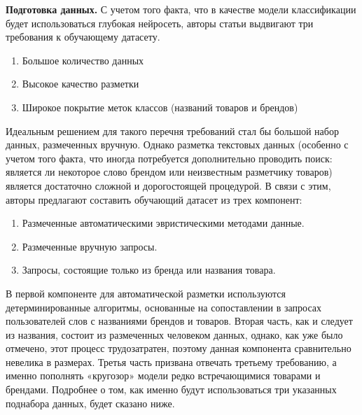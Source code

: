 \documentclass[12pt,a4paper]{article}
\begin{document}
\textbf{Подготовка данных.} С учетом того факта, что в качестве модели классификации будет использоваться глубокая нейросеть, авторы статьи выдвигают три требования к обучающему датасету.

\begin{enumerate}
    \item Большое количество данных
    \item Высокое качество разметки
    \item Широкое покрытие меток классов (названий товаров и брендов)
\end{enumerate}

\noindent Идеальным решением для такого перечня требований стал бы большой набор данных, размеченных вручную. Однако разметка текстовых данных (особенно с учетом того факта, что иногда потребуется дополнительно проводить поиск: является ли некоторое слово брендом или неизвестным разметчику товаров) является достаточно сложной и дорогостоящей процедурой. В связи с этим, авторы предлагают составить обучающий датасет из трех компонент:

\begin{enumerate}
    \item Размеченные автоматическими эвристическими методами данные.
    \item Размеченные вручную запросы.
    \item Запросы, состоящие только из бренда или названия товара.
\end{enumerate}

\noindent В первой компоненте для автоматической разметки используются детерминированные алгоритмы, основанные на сопоставлении в запросах пользователей слов с названиями брендов и товаров. Вторая часть, как и следует из названия, состоит из размеченных человеком данных, однако, как уже было отмечено, этот процесс трудозатратен, поэтому данная компонента сравнительно невелика в размерах. Третья часть призвана отвечать третьему требованию, а именно пополнять «кругозор» модели редко встречающимися товарами и брендами. Подробнее о том, как именно будут использоваться три указанных поднабора данных, будет сказано ниже.
\end{document}
